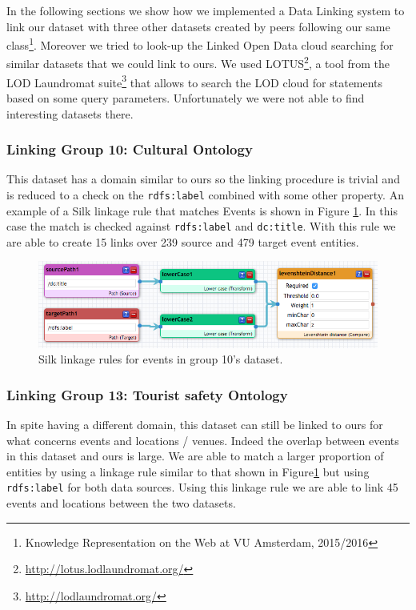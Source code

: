 \documentclass[runningheads,a4paper]{../../StyleFiles/llncs}
\begin{document}
In the following sections we show how we implemented a Data Linking system to
link our dataset with three other datasets created by peers following our same
class\footnote{Knowledge Representation on the Web at VU Amsterdam, 2015/2016}.
Moreover we tried to look-up the Linked Open Data cloud searching for similar
datasets that we could link to ours. We used
LOTUS\footnote{\url{http://lotus.lodlaundromat.org/}}, a tool from the LOD
Laundromat suite\footnote{\url{http://lodlaundromat.org/}}\cite{beek2014lod}
that allows to search the LOD cloud for statements based on some query
parameters. Unfortunately we were not able to find interesting datasets there.

\subsubsection{Linking Group 10: Cultural Ontology}
This dataset has a domain similar to ours so the linking procedure
is trivial and is reduced to a check on the \texttt{rdfs:label} combined with some other property. An example of a Silk linkage rule that matches Events is shown in Figure \ref{fig:link_event_g10}. In this case the match is checked against \texttt{rdfs:label} and \texttt{dc:title}. With this rule we are able to create 15 links over 239 source and 479 target event entities.

\begin{figure}[h]
	\centering
	\includegraphics[width=1\textwidth]{img/link_event_g10.png}
	\caption{Silk linkage rules for events in group 10's dataset.}
	\label{fig:link_event_g10}
\end{figure}

\subsubsection{Linking Group 13: Tourist safety Ontology}
In spite having a different domain, this dataset can still be linked to ours for what concerns events and locations / venues. Indeed the overlap between events in this dataset and ours is large. We are able to match a larger proportion of entities by using a linkage rule similar to that shown in Figure\ref{fig:link_event_g10} but using \texttt{rdfs:label} for both data sources. Using this linkage rule we are able to link 45 events and locations between the two datasets.
\end{document}
